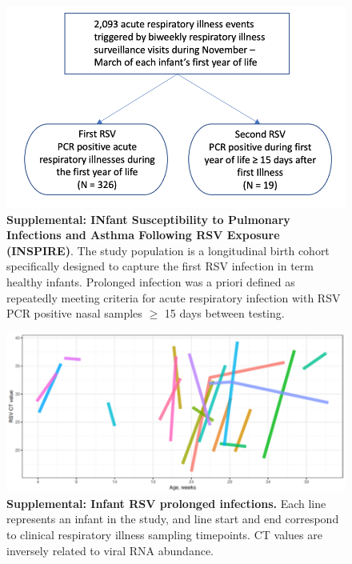 \documentclass{article} %
\begin{document}
\begin{figure}[ht] \hspace*{0cm}  \begin{center}
        \includegraphics[scale=0.4]{flowchart}
	\caption{\textbf{Supplemental: INfant Susceptibility to Pulmonary Infections and Asthma Following RSV Exposure (INSPIRE)}.
	 The study population is a longitudinal birth cohort specifically designed to capture the first RSV infection in term healthy infants. Prolonged infection was a priori defined as repeatedly meeting criteria for acute respiratory infection with RSV PCR positive nasal samples $\ge$ 15 days between testing.}
	\label{fig:1}
 \end{center} \end{figure}


\begin{figure}[ht] \hspace*{0cm}  \begin{center}
    \includegraphics[scale=0.5]{CTvalues}
	\caption{\textbf{Supplemental: Infant RSV prolonged infections.} Each line represents an infant in the study, and line start and end correspond to clinical respiratory illness sampling timepoints. CT values are inversely related to viral RNA abundance.}
	\label{fig:CTvalues}
 \end{center} \end{figure}
 
\end{document}
